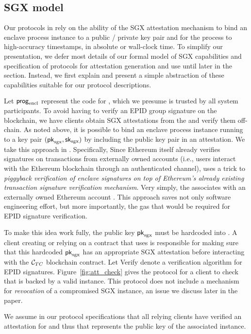 \subsection{SGX model} 

Our protocols in \tc rely on the ability of the SGX attestation mechanism to bind an enclave process instance to a public / private key pair and for the process to high-accuracy timestamps, in absolute or wall-clock time. To simplify our presentation, we defer most details of our formal model of SGX capabilities and specification of protocols for attestation generation and use until later in the section. Instead, we first explain and present a simple abstraction of these capabilities suitable for our \tc protocol descriptions. 

Let ${\sf prog}_{\textrm{encl}}$ represent the code for \encname, which we presume is trusted by all system participants. To avoid having to verify an EPID group signature on the blockchain, we have clients obtain SGX attestations from the \medname and verify them off-chain. As noted above, it is possible to bind an enclave process instance running \enclaveprog to a key pair $({\sf pk}_{\textrm{sgx}}, {\sf sk}_{\textrm{sgx}})$ by including the public key pair in an attestation. We take this approach in \tc. Specifically, Since Ethereum itself 
already verifies signatures on transactions from externally owned accounts (i.e., users interact with the  Ethereum blockchain through an authenticated channel), \tc uses a trick to {\it piggyback verification of enclave signatures on top of Ethereum's already existing transaction signature verification mechanism}. Very simply, the \encname associates \pksgx with an externally owned Ethereum account \tcadd. 
This approach saves not only software engineering effort, but more importantly,  the gas that would be required for EPID signature verification.

To make this idea work fully, the public key ${\sf pk}_{\textrm{sgx}}$ must be hardcoded into \tcont. A client creating or relying on a contract that uses \tcont is responsible for making sure that this hardcoded ${\sf pk}_{\textrm{sgx}}$ has an appropriate SGX attestation before interacting with the ${\cal C}_{TC}$  blockchain contract.  Let {\sf Verify} denote a verification algorithm for EPID signatures. Figure~\ref{fig:att_check} gives the protocol for a client to check that \tcont is backed by a valid \encname instance. This protocol does not include a mechanism for \emph{revocation} of a compromised SGX instance, an issue we discuss later in the paper.

We assume in our protocol specifications that all relying clients have verified an attestation for \encname and thus that \pksgx represents the public key of the associated instance.


